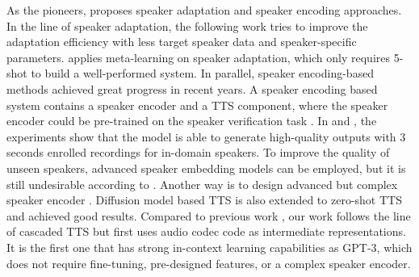 \documentclass{article}
\theoremstyle{plain}
\theoremstyle{definition}
\theoremstyle{remark}
\begin{document}
 As the pioneers, \cite{DBLP:conf/nips/ArikCPPZ18} proposes speaker adaptation and speaker encoding approaches. In the line of speaker adaptation, the following work \citep{DBLP:conf/iclr/ChenASBRZWCTLGO19, DBLP:conf/interspeech/WangTFYWZ20,DBLP:conf/iclr/Chen0LLQZL21} tries to improve the adaptation efficiency with less target speaker data and speaker-specific parameters. \cite{DBLP:journals/taslp/HuangLLCL22} applies meta-learning on speaker adaptation, which only requires 5-shot to build a well-performed system. In parallel, speaker encoding-based methods achieved great progress in recent years.  A speaker encoding based system contains a speaker encoder and a TTS component, where the speaker encoder could be pre-trained on the speaker verification task \citep{DBLP:conf/nips/JiaZWWSRCNPLW18}. In \cite{DBLP:conf/nips/JiaZWWSRCNPLW18} and \cite{DBLP:conf/nips/ArikCPPZ18}, the experiments show that the model is able to generate high-quality outputs with 3 seconds enrolled recordings for in-domain speakers. To improve the quality of unseen speakers, advanced speaker embedding models \citep{DBLP:conf/odyssey/CaiCL18} can be employed, but it is still undesirable according to \cite{DBLP:journals/corr/abs-2106-15561}. Another way is to design advanced but complex speaker encoder \citep{DBLP:conf/interspeech/Wu00HZSQL22}. Diffusion model based TTS \citep{DBLP:conf/icml/PopovVGSK21, DBLP:conf/icml/KimKY22} is also extended to zero-shot TTS  \citep{DBLP:journals/corr/abs-2211-09383} and achieved good results.  Compared to previous work \citep{DBLP:conf/nips/RenRTQZZL19, DBLP:conf/interspeech/DuGC022}, our work follows the line of cascaded TTS but first uses audio codec code as intermediate representations. It is the first one that has strong in-context learning capabilities as GPT-3, which does not require fine-tuning, pre-designed features, or a complex speaker encoder. 
\end{document}
